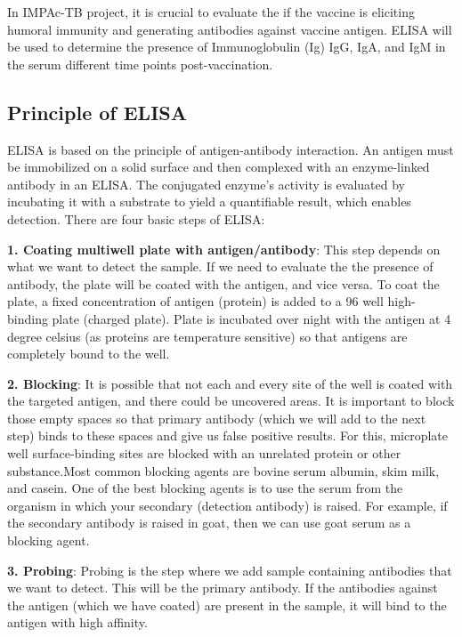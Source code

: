 \documentclass[
]{book}
\begin{document}
In IMPAc-TB project, it is crucial to evaluate the if the vaccine is eliciting humoral immunity and generating antibodies against vaccine antigen. ELISA will
be used to determine the presence of Immunoglobulin (Ig) IgG, IgA, and IgM in
the serum different time points post-vaccination.

\hypertarget{principle-of-elisa}{%
\subsection{\texorpdfstring{\textbf{Principle of ELISA}}{Principle of ELISA}}\label{principle-of-elisa}}

ELISA is based on the principle of antigen-antibody interaction. An antigen must be immobilized on a solid surface and then complexed with an enzyme-linked antibody in an ELISA. The conjugated enzyme's activity is evaluated by incubating it with a substrate to yield a quantifiable result, which enables detection. There are four basic steps of ELISA:

\textbf{1. Coating multiwell plate with antigen/antibody}: This step depends on what we want to detect the sample. If we need to evaluate the the presence of antibody, the plate will be coated with the antigen, and vice versa. To coat the plate, a fixed concentration of antigen (protein) is added to a 96 well high-binding plate (charged plate). Plate is incubated over night with the antigen at 4 degree celsius (as proteins are temperature sensitive) so that antigens are completely bound to the well.

\textbf{2. Blocking}: It is possible that not each and every site of the well is coated with the targeted antigen, and there could be uncovered areas. It is important to block those empty spaces so that primary antibody (which we will add to the next step) binds to these spaces and give us false positive results. For this, microplate well surface-binding sites are blocked with an unrelated protein or other substance.Most common blocking agents are bovine serum albumin, skim milk, and casein. One of the best blocking agents is to use the serum from the organism in which your secondary (detection antibody) is raised. For example, if the secondary antibody is raised in goat, then we can use goat serum as a blocking agent.

\textbf{3. Probing}: Probing is the step where we add sample containing antibodies that we want to detect. This will be the primary antibody. If the antibodies against the antigen (which we have coated) are present in the sample, it will bind to the antigen with high affinity.
\end{document}
